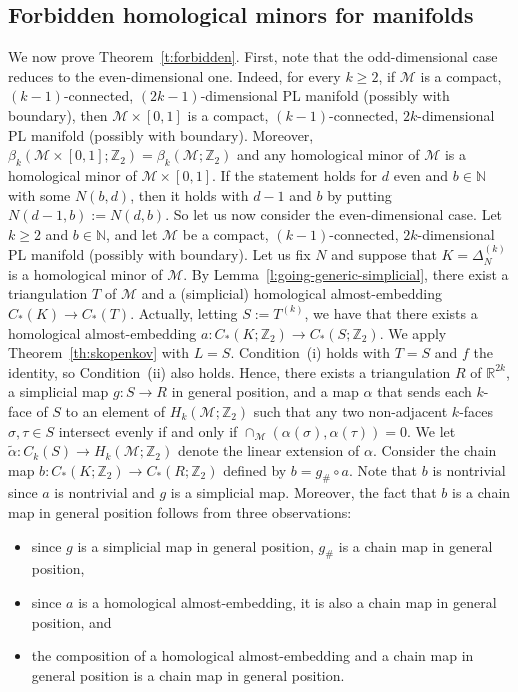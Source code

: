 \documentclass[11pt]{article}
\newcommand{\R}{\mathbb{R}}
\newcommand{\Z}{\mathbb{Z}}
\newcommand{\N}{\mathbb{N}}
\newcommand{\M}{\mathcal{M}}
\begin{document}
\subsection{Forbidden homological minors for manifolds}
%
We now prove Theorem~\ref{t:forbidden}. First, note that the odd-dimensional case reduces to the even-dimensional one. Indeed, for every $k \ge 2$, if $\M$ is a compact, $(k-1)$-connected, $(2k-1)$-dimensional PL manifold (possibly with boundary), then $\M \times [0,1]$ is a compact, $(k-1)$-connected, $2k$-dimensional PL manifold (possibly with boundary). Moreover, $\beta_{k}(\M \times [0,1];\Z_2) = \beta_{k}(\M;\Z_2)$ and any homological minor of $\M$ is a homological minor of $\M \times [0,1]$. If the statement holds for $d$ even and $b \in \N$ with some $N(b,d)$, then it holds with $d-1$ and $b$ by putting $N(d-1,b) := N(d,b)$. So let us now consider the even-dimensional case.
%
\medskip
%
 Let $k \ge 2$ and $b \in \N$, and let $\M$ be a compact, $(k-1)$-connected, $2k$-dimensional PL manifold (possibly with boundary). Let us fix $N$ and suppose that $K = \Delta_N^{(k)}$ is a homological minor of $\M$. By Lemma~\ref{l:going-generic-simplicial}, there exist a triangulation $T$ of $\M$ and a (simplicial) homological almost-embedding $C_*(K)\to C_*(T)$. Actually, letting $S := T^{(k)}$, we have that there exists a homological almost-embedding $a:C_*(K;\Z_2) \to  C_*(S;\Z_2)$.
%
  \medskip
%
  We apply Theorem~\ref{th:skopenkov} with $L=S$. Condition~(i) holds with $T=S$ and $f$ the identity, so Condition~(ii) also holds. Hence, there exists a triangulation $R$ of $\R^{2k}$, a simplicial map $g:S \to R$ in general position, and a map $\alpha$ that sends each $k$-face of $S$ to an element of $H_k(\M;\Z_2)$ such that any two non-adjacent $k$-faces $\sigma,\tau \in S$ intersect evenly if and only if $\cap_{\M}(\alpha(\sigma),\alpha(\tau)) = 0$. We let $\tilde{\alpha}:C_k(S) \to H_k(\M;\Z_2)$ denote the linear extension of $\alpha$.
%
\medskip
%
Consider the chain map $b:C_*(K;\Z_2) \to C_*(R;\Z_2)$ defined by $b = g_\# \circ a$. Note that $b$ is nontrivial since $a$ is nontrivial and $g$ is a simplicial map. Moreover, the fact that $b$ is a chain map in general position follows from three observations:
%
\begin{itemize}
\item since $g$ is a simplicial map in general position, $g_\#$ is a chain map in general position,
\item since $a$ is a homological almost-embedding, it is also a chain map in general position, and 
\item the composition of a homological almost-embedding and a chain map in general position is a chain map in general position.
\end{itemize}
\end{document}
